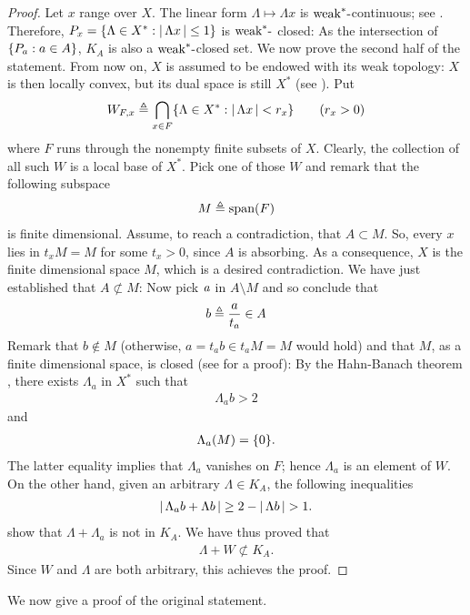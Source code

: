 \begin{proof}%
Let $x$ range over $X$. The linear form %
%
  $\Lambda \mapsto \Lambda x$ %
%
is $\text{weak}^\ast\text{-}$continuous; see . %
Therefore, %
%
  $P_x= \{\Lambda \in X^\ast: \left\lvert\, \Lambda x \,\right\rvert \leq 1\}$ %
%
is $\text{weak}^\ast\text{-}$ closed: %
As the intersection of $\{P_a: a\in A\}$, %
$K_A$ is also a $\text{weak}^\ast\text{-}$closed set. %
We now prove the second half of the statement. %
%
\newline\newline\noindent
%
From now on, $X$ is assumed to be endowed with its weak topology: %
$X$ is then locally convex, but its dual space is still %
%
  $X^\ast$ (see ). %
%
Put %
%
  \begin{align}
    W_{F, x} \triangleq \bigcap_{x\in F} \{\Lambda \in X^\ast: \left\lvert\, \Lambda x \,\right\rvert < r_x\} \quad\quad (r_x > 0)
  \end{align}
%
where $F$ runs through the nonempty finite subsets of $X$. %
%
Clearly, the collection of all such $W$ is a local base of $X^\ast$. %
Pick one of those $W$ and remark that the following subspace %
%
  \begin{align}
    M \triangleq \text{span}(F)
  \end{align}
%
is finite dimensional. %
Assume, to reach a contradiction, that $A\subset M$. %
So, every $x$ lies in $t_xM=M$ for some $t_x>0$, since $A$ is absorbing. %
As a consequence, $X$ is the finite dimensional space $M$, %
which is a desired contradiction.
%
We have just established that $A\not\subset M$: %
Now pick $\mathit{a}$ in $A\setminus M$ and so conclude that %
%
  \begin{align}
    b\triangleq \frac{a}{t_a}\in A
  \end{align}
%
Remark that $b\notin M$ (otherwise, $a = t_a b \in t_a M=M$ would hold) %
and that $M$, as a finite dimensional space, is closed %
(see  for a proof): %
By the Hahn-Banach theorem , %
there exists $\Lambda_a$ in $X^\ast$ such that 
%
  \begin{align}\label{3.11. Polar_4.}
    \Lambda_a b > 2
  \end{align}
%
and
%
  \begin{align}\label{3.11. Polar_4bis.}
    \Lambda_a (M) = \{0\}.
  \end{align}
%
The latter equality implies that $\Lambda_a$ vanishes on $F$; %
hence $\Lambda_a$ is an element of $W$. %
On the other hand, given an arbitrary $\Lambda \in K_A$, %
the following inequalities  %
%
  \begin{align}
    \left\lvert\, \Lambda_a b + \Lambda b \,\right\rvert 
      \geq 
    2 - \left\lvert\, \Lambda b \,\right\rvert 
      >
    1.
  \end{align}
%
show that $\Lambda + \Lambda_a$ is not in $K_A$. %
%
We have thus proved that
%
  \begin{align}
  \Lambda + W\not\subset K_A.
  \end{align}
%
Since $W$ and $\Lambda$ are both arbitrary, this achieves the proof. %
\end{proof}
%
\noindent
We now give a proof of the original statement. %
%
